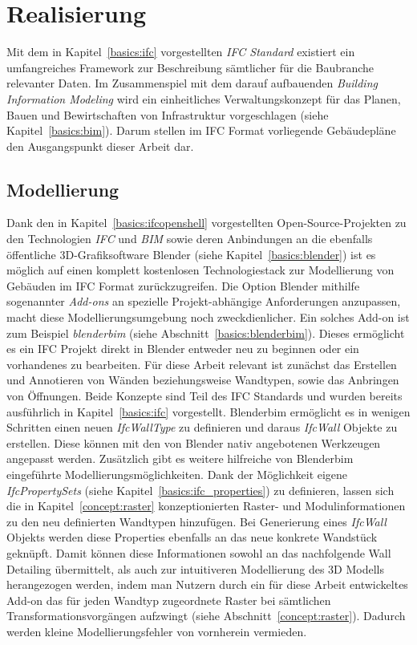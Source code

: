 \chapter{Realisierung}
Mit dem in Kapitel~\ref{basics:ifc} vorgestellten \textit{IFC Standard} existiert ein umfangreiches Framework zur Beschreibung sämtlicher für die Baubranche relevanter Daten. 
Im Zusammenspiel mit dem darauf aufbauenden \textit{Building Information Modeling} wird ein einheitliches Verwaltungskonzept für das Planen, Bauen und Bewirtschaften von Infrastruktur vorgeschlagen (siehe Kapitel~\ref{basics:bim}).
Darum stellen im IFC Format vorliegende Gebäudepläne den Ausgangspunkt dieser Arbeit dar.

\section{Modellierung}\label{real:modellierung}
Dank den in Kapitel~\ref{basics:ifcopenshell} vorgestellten Open-Source-Projekten zu den Technologien \textit{IFC} und \textit{BIM} sowie deren Anbindungen an die ebenfalls öffentliche 3D-Grafiksoftware Blender (siehe Kapitel~\ref{basics:blender}) ist es möglich auf einen komplett kostenlosen Technologiestack zur Modellierung von Gebäuden im IFC Format zurückzugreifen.
Die Option Blender mithilfe sogenannter \textit{Add-ons} an spezielle Projekt-abhängige Anforderungen anzupassen, macht diese Modellierungsumgebung noch zweckdienlicher.
Ein solches Add-on ist zum Beispiel \textit{blenderbim} (siehe Abschnitt~\ref{basics:blenderbim}). 
Dieses ermöglicht es ein IFC Projekt direkt in Blender entweder neu zu beginnen oder ein vorhandenes zu bearbeiten.
Für diese Arbeit relevant ist zunächst das Erstellen und Annotieren von Wänden beziehungsweise Wandtypen, sowie das Anbringen von Öffnungen.
Beide Konzepte sind Teil des IFC Standards und wurden bereits ausführlich in Kapitel~\ref{basics:ifc} vorgestellt.
Blenderbim ermöglicht es in wenigen Schritten einen neuen \textit{IfcWallType} zu definieren und daraus \textit{IfcWall} Objekte zu erstellen.
Diese können mit den von Blender nativ angebotenen Werkzeugen angepasst werden.
Zusätzlich gibt es weitere hilfreiche von Blenderbim eingeführte Modellierungsmöglichkeiten.
Dank der Möglichkeit eigene \textit{IfcPropertySets} (siehe Kapitel~\ref{basics:ifc_properties}) zu definieren, lassen sich die in Kapitel~\ref{concept:raster} konzeptionierten Raster- und Modulinformationen zu den neu definierten Wandtypen hinzufügen.
Bei Generierung eines \textit{IfcWall} Objekts werden diese Properties ebenfalls an das neue konkrete Wandstück geknüpft.
Damit können diese Informationen sowohl an das nachfolgende Wall Detailing übermittelt, als auch zur intuitiveren Modellierung des 3D Modells herangezogen werden, indem man Nutzern durch ein für diese Arbeit entwickeltes Add-on das für jeden Wandtyp zugeordnete Raster bei sämtlichen Transformationsvorgängen aufzwingt (siehe Abschnitt~\ref{concept:raster}).
Dadurch werden kleine Modellierungsfehler von vornherein vermieden.

